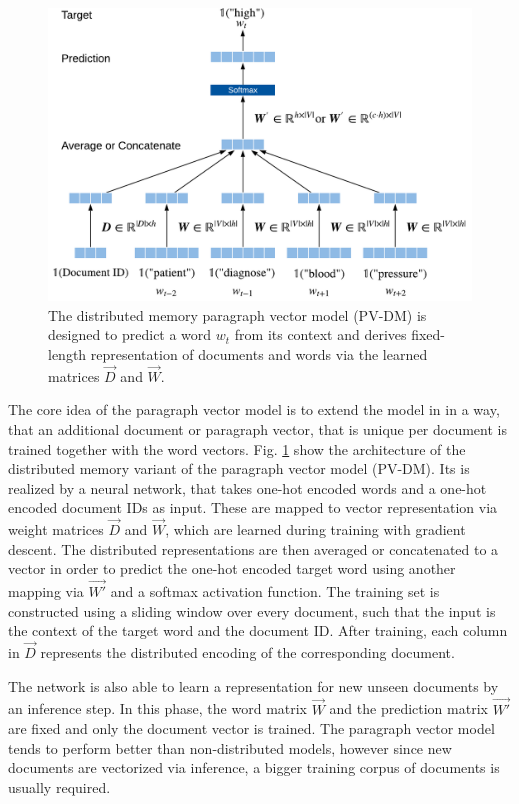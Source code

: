 \begin{figure}[!htbp]
	\centering
	\includegraphics[width=\textwidth]{figures/paragraph-vector}
	\caption[Distributed memory paragraph vector model]{The distributed memory paragraph vector model (PV-DM) is designed to predict a word $w_t$ from its context and derives fixed-length representation of documents and words via the learned matrices $\vec{D}$ and $\vec{W}$.}
	\label{fig:paragraph-vector}
\end{figure}

The core idea of the paragraph vector model is to extend the model in \cite{DBLP:journals/jmlr/BengioDVJ03} in a way, that an additional document or paragraph vector, that is unique per document is trained together with the word vectors.
Fig. \ref{fig:paragraph-vector} show the architecture of the distributed memory variant of the paragraph vector model (PV-DM).
Its is realized by a neural network, that takes one-hot encoded words and a one-hot encoded document IDs as input.
These are mapped to vector representation via weight matrices $\vec{D}$ and $\vec{W}$, which are learned during training with gradient descent.
The distributed representations are then averaged or concatenated to a vector in order to predict the one-hot encoded target word using another mapping via $\vec{W'}$ and a softmax activation function.
The training set is constructed using a sliding window over every document, such that the input is the context of the target word and the document ID.
After training, each column in $\vec{D}$ represents the distributed encoding of the corresponding document.

The network is also able to learn a representation for new unseen documents by an inference step.
In this phase, the word matrix $\vec{W}$ and the prediction matrix $\vec{W'}$ are fixed and only the document vector is trained.
The paragraph vector model tends to perform better than non-distributed models, however since new documents are vectorized via inference, a bigger training corpus of documents is usually required.


